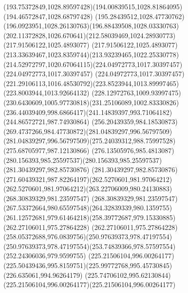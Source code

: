 {{\curveto(193.75372849,1028.89597428)(194.00839515,1028.81864095)(194.46572847,1028.68797428)
\curveto(195.28439512,1028.47730762)(196.0923951,1028.26130763)(196.88439508,1028.03330763)
\curveto(202.11372828,1026.670641)(212.58039469,1024.28930773)(217.91506122,1025.4893077)
\curveto(217.91506122,1025.4893077)(213.33639467,1023.8359744)(213.93239465,1022.25330778)
\curveto(214.52972797,1020.67064115)(224.04972773,1017.30397457)(224.04972773,1017.30397457)
\curveto(224.04972773,1017.30397457)(221.29106113,1016.48530792)(223.8523944,1013.89997465)
\lineto(223.8003944,1013.92664132)
\curveto(228.12972763,1009.93997475)(230.6430609,1005.97730818)(231.25106089,1002.83330826)
\curveto(236.44039409,998.6866417)(241.14839397,993.71064182)(244.86572721,987.74930864)
\curveto(256.20439359,984.18530873)(269.4737266,984.47730872)(281.04839297,996.56797509)
\curveto(281.04839297,996.56797509)(275.24039312,988.75997528)(275.68705977,987.12130866)
\curveto(276.13505976,985.4813087)(280.156393,985.25597537)(280.156393,985.25597537)
\lineto(281.30439297,982.85730876)
\curveto(281.30439297,982.85730876)(271.60439321,987.82264197)(262.5270601,981.97064212)
\curveto(262.5270601,981.97064212)(263.22706009,980.24130883)(268.30839329,981.23597547)
\curveto(268.30839329,981.23597547)(267.53372664,980.65597548)(264.32839339,980.1359755)
\curveto(261.12572681,979.61464218)(258.39772687,979.15330885)(262.27106011,975.27864228)
\curveto(262.27106011,975.27864228)(258.05372688,976.0839756)(250.97639373,978.47197554)
\curveto(250.97639373,978.47197554)(253.74839366,978.57597554)(252.24306036,979.9599755)
\moveto(225.21506104,996.00264177)
\curveto(225.50439436,995.8159751)(225.99772768,995.45730845)(226.635061,994.96264179)
\curveto(225.74706102,995.62130844)(225.21506104,996.00264177)(225.21506104,996.00264177)
}
}
{
}
